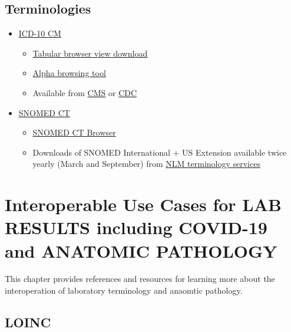 \documentclass[
]{journal}
\providecommand{\tightlist}{%
  \setlength{\itemsep}{0pt}\setlength{\parskip}{0pt}}
\begin{document}
\hypertarget{terminologies}{%
\subsection{Terminologies}\label{terminologies}}

\begin{itemize}
\tightlist
\item
  \href{https://www.cms.gov/medicare/icd-10/2022-icd-10-cm}{ICD-10 CM}

  \begin{itemize}
  \tightlist
  \item
    \href{https://ftp.cdc.gov/pub/health_statistics/nchs/publications/ICD10CM/2022/icd10cm_tabular_2022.pdf}{Tabular browser view download}
  \item
    \href{https://icd10cmtool.cdc.gov/}{Alpha browsing tool}
  \item
    Available from \href{https://www.cms.gov/medicare/icd-10/2022-icd-10-cm}{CMS} or \href{https://ftp.cdc.gov/pub/Health_Statistics/NCHS/Publications/ICD10CM/2022/}{CDC}
  \end{itemize}
\item
  \href{https://www.snomed.org/}{SNOMED CT}

  \begin{itemize}
  \tightlist
  \item
    \href{https://browser.ihtsdotools.org/}{SNOMED CT Browser}
  \item
    Downloads of SNOMED International + US Extension available twice yearly (March and September) from \href{https://uts.nlm.nih.gov/uts/}{NLM terminology services}
  \end{itemize}
\end{itemize}

\hypertarget{interoperable-use-cases-for-lab-results-including-covid-19-and-anatomic-pathology}{%
\section{Interoperable Use Cases for LAB RESULTS including COVID-19 and ANATOMIC PATHOLOGY}\label{interoperable-use-cases-for-lab-results-including-covid-19-and-anatomic-pathology}}

This chapter provides references and resources for learning more about the interoperation of laboratory terminology and anaomtic pathology.

\hypertarget{loinc}{%
\subsection{LOINC}\label{loinc}}
\end{document}
